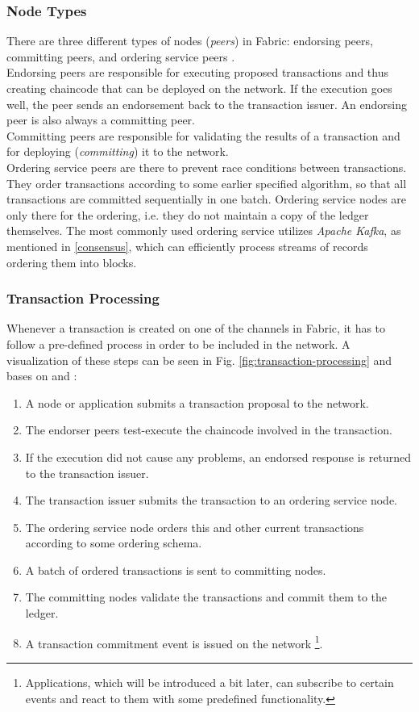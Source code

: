 \subsubsection{Node Types}
There are three different types of nodes (\textit{peers}) in Fabric: endorsing peers, committing peers, and ordering service peers \cite[p. 5]{Androulaki2018}. \\
Endorsing peers are responsible for executing proposed transactions and thus creating chaincode that can be deployed on the network. If the execution goes well, the peer sends an endorsement back to the transaction issuer. An endorsing peer is also always a committing peer. \\
Committing peers are responsible for validating the results of a transaction and for deploying (\textit{committing}) it to the network. \\
Ordering service peers are there to prevent race conditions between transactions. They order transactions according to some earlier specified algorithm, so that all transactions are committed sequentially in one batch. Ordering service nodes are only there for the ordering, i.e. they do not maintain a copy of the ledger themselves. The most commonly used ordering service utilizes \textit{Apache Kafka}, as mentioned in \ref{consensus}, which can efficiently process streams of records ordering them into blocks. 

\subsubsection{Transaction Processing}
Whenever a transaction is created on one of the channels in Fabric, it has to follow a pre-defined process in order to be included in the network. A visualization of these steps can be seen in Fig. \ref{fig:transaction-processing} and bases on \cite[p. 6]{Androulaki2018} and \cite[pp. 11]{Matthes2019-2}: 
\begin{enumerate}
	\item A node or application submits a transaction proposal to the network. 
	\item The endorser peers test-execute the chaincode involved in the transaction. 
	\item If the execution did not cause any problems, an endorsed response is returned to the transaction issuer. 
	\item The transaction issuer submits the transaction to an ordering service node. 
	\item The ordering service node orders this and other current transactions according to some ordering schema. 
	\item A batch of ordered transactions is sent to committing nodes.
	\item The committing nodes validate the transactions and commit them to the ledger. 
	\item A transaction commitment event is issued on the network \footnote{Applications, which will be introduced a bit later, can subscribe to certain events and react to them with some predefined functionality.}. 
\end{enumerate}

